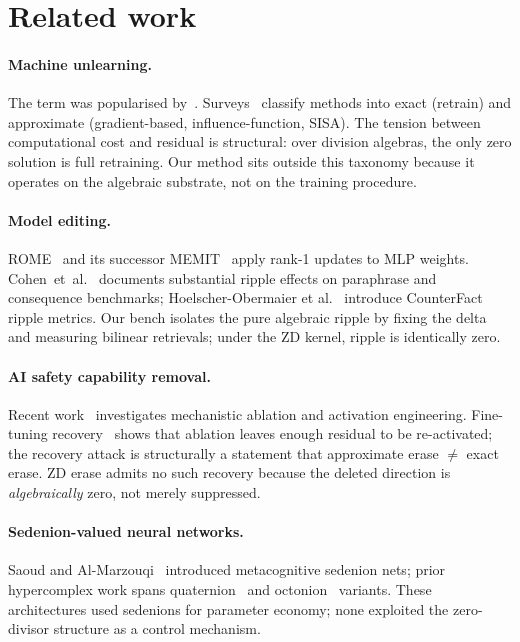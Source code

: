 \documentclass{article}
\begin{document}
\section{Related work}

\paragraph{Machine unlearning.}  The term was popularised
by~\cite{bourtoule2021machine,ginart2019making}.  Surveys~\cite{nguyen2022survey,xu2024machine}
classify methods into exact (retrain) and approximate (gradient-based,
influence-function, SISA).  The tension between computational cost and
residual is structural: over division algebras, the only zero solution
is full retraining.  Our method sits outside this taxonomy because it
operates on the algebraic substrate, not on the training procedure.

\paragraph{Model editing.}  ROME~\cite{meng2022locating} and its successor
MEMIT~\cite{meng2023massediting} apply rank-1 updates to MLP weights.
Cohen~et~al.~\cite{cohen2024evaluating} documents substantial ripple effects
on paraphrase and consequence benchmarks; Hoelscher-Obermaier et
al.~\cite{hoelscher2023detecting} introduce CounterFact ripple metrics.
Our bench isolates the pure algebraic ripple by fixing the delta and
measuring bilinear retrievals; under the ZD kernel, ripple is identically
zero.

\paragraph{AI safety capability removal.}  Recent
work~\cite{li2024the,anthropic2024circuit,ogier2024removing} investigates
mechanistic ablation and activation engineering.
Fine-tuning recovery~\cite{qi2024finetuning,yang2024shadow,lermen2023lora}
shows that ablation leaves enough residual to be re-activated; the
recovery attack is structurally a statement that approximate erase $\neq$
exact erase.  ZD erase admits no such recovery because the deleted
direction is \emph{algebraically} zero, not merely suppressed.

\paragraph{Sedenion-valued neural networks.}  Saoud and
Al-Marzouqi~\cite{saoud2020sedenion} introduced metacognitive sedenion
nets; prior hypercomplex work spans quaternion~\cite{parcollet2019quaternion}
and octonion~\cite{popa2016octonion} variants.  These architectures used
sedenions for parameter economy; none exploited the zero-divisor
structure as a control mechanism.
\end{document}
